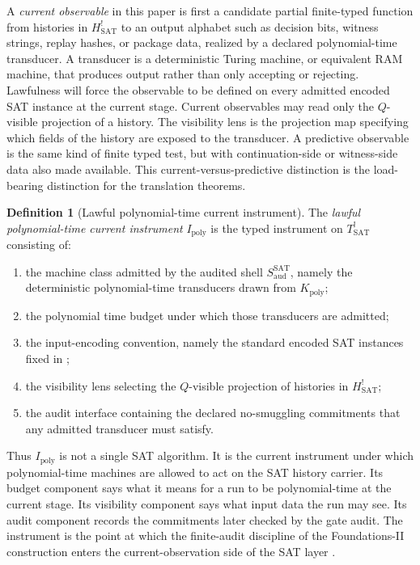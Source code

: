\documentclass[11pt]{article}
\newcommand{\Tsat}{T^{!}_{\mathrm{SAT}}}
\newcommand{\Saud}{S_{\mathrm{aud}}^{\mathrm{SAT}}}
\newcommand{\Hsat}{H^{!}_{\mathrm{SAT}}}
\newcommand{\Ipoly}{I_{\mathrm{poly}}}
\theoremstyle{definition}
\newtheorem{definition}[theorem]{Definition}
\begin{document}
A \emph{current observable} in this paper is first a candidate partial
finite-typed function from histories in \(\Hsat\) to an output
alphabet such as decision bits, witness strings, replay hashes, or
package data, realized by a declared polynomial-time transducer.  A
transducer is a deterministic Turing machine, or equivalent RAM
machine, that produces output rather than only accepting or rejecting.
Lawfulness will force the observable to be defined on every admitted
encoded SAT instance at the current stage.  Current observables may
read only the \(Q\)-visible projection of a history.  The visibility
lens is the projection map specifying which fields of the history are
exposed to the transducer.  A predictive observable is the same kind
of finite typed test, but with continuation-side or witness-side data
also made available.  This current-versus-predictive distinction is
the load-bearing distinction for the translation theorems.

\begin{definition}[Lawful polynomial-time current instrument]
\label{def:pvnp:i-poly}
The \emph{lawful polynomial-time current instrument} \(\Ipoly\) is the
typed instrument on \(\Tsat\) consisting of:
\begin{enumerate}
  \item the machine class admitted by the audited shell \(\Saud\),
  namely the deterministic polynomial-time transducers drawn from
  \(K_{\mathrm{poly}}\);
  \item the polynomial time budget under which those transducers are
  admitted;
  \item the input-encoding convention, namely the standard encoded SAT
  instances fixed in ;
  \item the visibility lens selecting the \(Q\)-visible projection of
  histories in \(\Hsat\);
  \item the audit interface containing the declared no-smuggling
  commitments that any admitted transducer must satisfy.
\end{enumerate}
\end{definition}

Thus \(\Ipoly\) is not a single SAT algorithm.  It is the current
instrument under which polynomial-time machines are allowed to act on
the SAT history carrier.  Its budget component says what it means for
a run to be polynomial-time at the current stage.  Its visibility
component says what input data the run may see.  Its audit component
records the commitments later checked by the gate audit.  The
instrument is the point at which the finite-audit discipline of the
Foundations-II construction enters the current-observation side of the
SAT layer \citep{TsiokosFoundationsII2026}.
\end{document}
